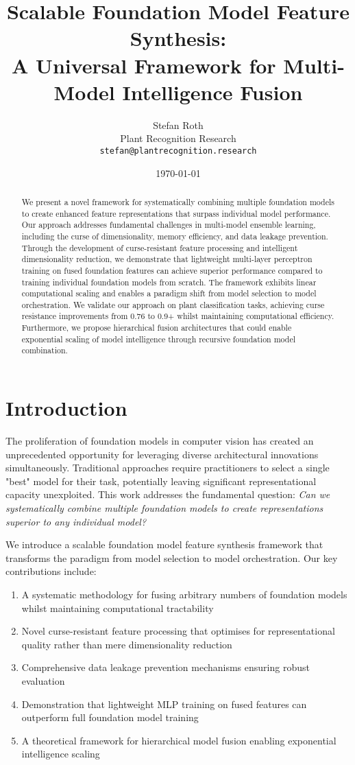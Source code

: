 \documentclass[11pt,a4paper]{article}
\title{Scalable Foundation Model Feature Synthesis: \\
A Universal Framework for Multi-Model Intelligence Fusion}
\author{
Stefan Roth\\
Plant Recognition Research\\
\texttt{stefan@plantrecognition.research}
}
\date{\today}
\begin{document}
\maketitle

\begin{abstract}
We present a novel framework for systematically combining multiple foundation models to create enhanced feature representations that surpass individual model performance. Our approach addresses fundamental challenges in multi-model ensemble learning, including the curse of dimensionality, memory efficiency, and data leakage prevention. Through the development of curse-resistant feature processing and intelligent dimensionality reduction, we demonstrate that lightweight multi-layer perceptron training on fused foundation features can achieve superior performance compared to training individual foundation models from scratch. The framework exhibits linear computational scaling and enables a paradigm shift from model selection to model orchestration. We validate our approach on plant classification tasks, achieving curse resistance improvements from 0.76 to 0.9+ whilst maintaining computational efficiency. Furthermore, we propose hierarchical fusion architectures that could enable exponential scaling of model intelligence through recursive foundation model combination.
\end{abstract}

\section{Introduction}

The proliferation of foundation models in computer vision has created an unprecedented opportunity for leveraging diverse architectural innovations simultaneously. Traditional approaches require practitioners to select a single "best" model for their task, potentially leaving significant representational capacity unexploited. This work addresses the fundamental question: \emph{Can we systematically combine multiple foundation models to create representations superior to any individual model?}

We introduce a scalable foundation model feature synthesis framework that transforms the paradigm from model selection to model orchestration. Our key contributions include:

\begin{enumerate}
    \item A systematic methodology for fusing arbitrary numbers of foundation models whilst maintaining computational tractability
    \item Novel curse-resistant feature processing that optimises for representational quality rather than mere dimensionality reduction
    \item Comprehensive data leakage prevention mechanisms ensuring robust evaluation
    \item Demonstration that lightweight MLP training on fused features can outperform full foundation model training
    \item A theoretical framework for hierarchical model fusion enabling exponential intelligence scaling
\end{enumerate}
\end{document}
